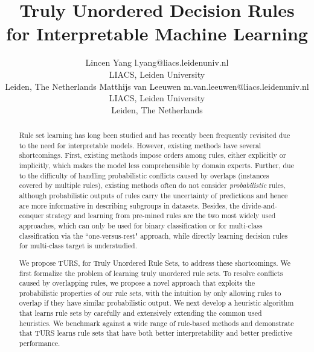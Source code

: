 \documentclass[twoside,11pt]{article}
\begin{document}
\title{Truly Unordered Decision Rules for Interpretable Machine Learning}

\author{\name Lincen Yang \email l.yang@liacs.leidenuniv.nl \\
       \addr LIACS, 
       Leiden University\\
       Leiden, The Netherlands
       \AND
       \name Matthijs van Leeuwen \email m.van.leeuwen@liacs.leidenuniv.nl \\
       \addr LIACS, 
       Leiden University\\
       Leiden, The Netherlands}


\maketitle

\begin{abstract}%
Rule set learning has long been studied and has recently been frequently revisited due to the need for interpretable models. However, existing methods have several shortcomings. First, existing methods impose orders among rules, either explicitly or implicitly, which makes the model less comprehensible by domain experts. Further, due to the difficulty of handling probabilistic conflicts caused by overlaps (instances covered by multiple rules), existing methods often do not consider \emph{probabilistic} rules, although probabilistic outputs of rules carry the uncertainty of predictions and hence are more informative in describing subgroups in datasets. Besides, the divide-and-conquer strategy and learning from pre-mined rules are the two most widely used approaches, which can only be used for binary classification or for multi-class classification via the ``one-versus-rest" approach, while directly learning decision rules for multi-class target is understudied. 

We propose TURS, for Truly Unordered Rule Sets, to address these shortcomings. We first formalize the problem of learning truly unordered rule sets. To resolve conflicts caused by overlapping rules, we propose a novel approach that exploits the probabilistic properties of our rule sets, with the intuition by only allowing rules to overlap if they have similar probabilistic output. We next develop a heuristic algorithm that learns rule sets by carefully and extensively extending the common used heuristics. We benchmark against a wide range of rule-based methods and demonstrate that TURS learns rule sets that have both better interpretability and better predictive performance. 





\end{abstract}
\end{document}
